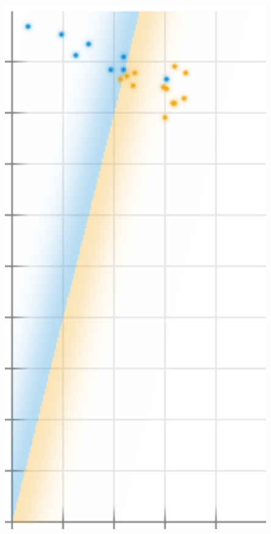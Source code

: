   \begin{marginfigure}[-2.5cm]
    \centering
    \includegraphics[width=0.85\textwidth]{example-mnist/train-plain-cropped}
    \caption{%
      \textbf{Featurized training data.}
      Our $N=20$ many training examples, viewed in the
      brightness-width plane.  The vertical \emph{brightness} axis ranges
      $[0.0,1.0]$; the horizontal \emph{width} axis ranges $[0.0,0.5]$.
      The origin is at the lower left.  {} dots represent
      $y={\rng{3}}$ examples; {} dot, $y={\blu{1}}$ examples.
      We eyeballed the line $-1\cdot \text{brightness} +4\cdot\text{width}=0$
      to separate the two kinds of examples.
    }
  \end{marginfigure}

